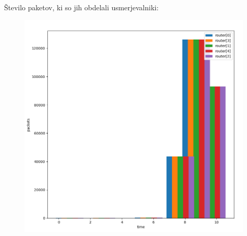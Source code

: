\documentclass[11pt,a4paper,slovene]{myarticle}
\begin{document}
\pagebreak

Število paketov, ki so jih obdelali usmerjevalniki:
\begin{figure}[h]
  \includegraphics[width=\linewidth]{packets-4.png}
\end{figure}

\pagebreak
\end{document}
